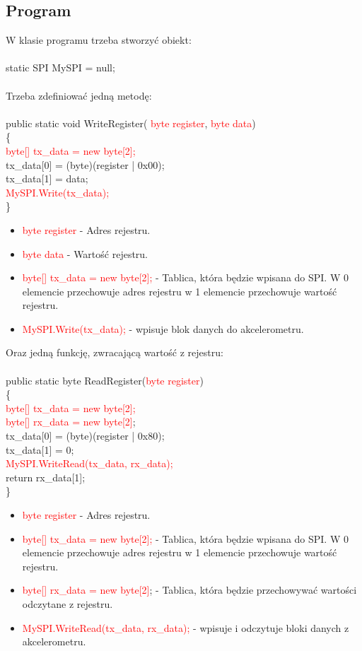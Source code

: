 \documentclass{article}
\begin{document}
\subsection{Program}
W klasie programu trzeba stworzyć obiekt:\\\\
static SPI MySPI = null;\\\\
Trzeba zdefiniować jedną metodę:\\\\
public static void WriteRegister( \textcolor{red}{byte register},  \textcolor{red}{byte data})\\
\{\\
\textcolor{red}{byte[] tx\_data = new byte[2];}\\
tx\_data[0] = (byte)(register | 0x00);\\
tx\_data[1] = data;                \\   
\textcolor{red}{MySPI.Write(tx\_data);}\\
\}\\
\begin{itemize}
\item \textcolor{red}{byte register} - Adres rejestru.
\item \textcolor{red}{byte data} - Wartość rejestru.
\item \textcolor{red}{byte[] tx\_data = new byte[2];} - Tablica, która będzie wpisana do SPI. W 0 elemencie przechowuje adres rejestru w 1 elemencie przechowuje wartość rejestru.
\item \textcolor{red}{MySPI.Write(tx\_data);} - wpisuje blok danych do akcelerometru.
\end{itemize}
Oraz jedną funkcję, zwracającą wartość z rejestru:\\\\
public static byte ReadRegister(\textcolor{red}{byte register})\\
 \{\\
\textcolor{red}{byte[] tx\_data = new byte[2];}\\
\textcolor{red}{byte[] rx\_data = new byte[2]};\\
 tx\_data[0] = (byte)(register | 0x80);\\
 tx\_data[1] = 0;\\
 \textcolor{red}{MySPI.WriteRead(tx\_data, rx\_data);}\\
 return rx\_data[1];   \\                   
\}
\begin{itemize}
\item \textcolor{red}{byte register} - Adres rejestru.
\item \textcolor{red}{byte[] tx\_data = new byte[2];} - Tablica, która będzie wpisana do SPI. W 0 elemencie przechowuje adres rejestru w 1 elemencie przechowuje wartość rejestru.
\item \textcolor{red}{byte[] rx\_data = new byte[2]}; - Tablica, która będzie przechowywać wartości odczytane z rejestru.
\item \textcolor{red}{MySPI.WriteRead(tx\_data, rx\_data);} - wpisuje i odczytuje bloki danych z akcelerometru.
\end{itemize}
\end{document}
